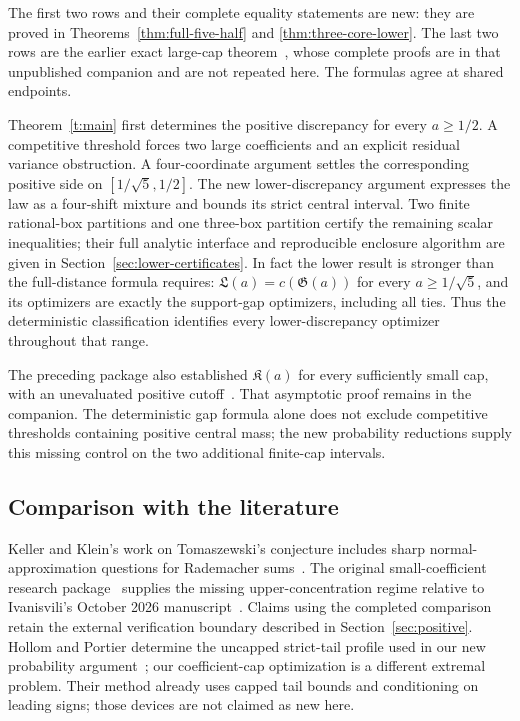 \documentclass[11pt]{article}
\theoremstyle{remark}\newtheorem{remark}[theorem]{Remark}
\begin{document}
The first two rows and their complete equality statements are new:
they are proved in Theorems~\ref{thm:full-five-half} and
\ref{thm:three-core-lower}. The last two rows are the earlier exact
large-cap theorem~\cite{Prior}, whose complete proofs are in that
unpublished companion and are not repeated here. The formulas agree at
shared endpoints.

Theorem~\ref{t:main} first determines the positive discrepancy for every
$a\ge1/2$. A competitive threshold forces two large coefficients and
an explicit residual variance obstruction. A four-coordinate argument
settles the corresponding positive side on $[1/\sqrt5,1/2]$.
The new lower-discrepancy argument expresses the law as a four-shift
mixture and bounds its strict central interval. Two finite rational-box
partitions and one three-box partition certify the remaining scalar
inequalities; their full analytic interface and reproducible enclosure
algorithm are given in Section~\ref{sec:lower-certificates}.
In fact the lower result is stronger than the full-distance formula
requires: $\mathfrak L(a)=c(\mathfrak G(a))$ for every
$a\ge1/\sqrt5$, and its optimizers are exactly the support-gap
optimizers, including all ties. Thus the deterministic classification
identifies every lower-discrepancy optimizer throughout that range.

The preceding package also established $\mathfrak K(a)$ for every
sufficiently small cap, with an unevaluated positive cutoff~\cite{Prior}.
That asymptotic proof remains in the companion. The deterministic gap
formula alone does not exclude competitive thresholds containing
positive central mass; the new probability reductions supply this
missing control on the two additional finite-cap intervals.

\subsection{Comparison with the literature}
Keller and Klein's work on Tomaszewski's conjecture includes sharp
normal-approximation questions for Rademacher sums~\cite{KK}. The
original small-coefficient research package~\cite{Original} supplies the
missing upper-concentration regime relative to Ivanisvili's October 2026
manuscript~\cite{Ivanisvili}. Claims using the completed comparison retain
the external verification boundary described in Section~\ref{sec:positive}.
Hollom and Portier determine the uncapped strict-tail profile used in our
new probability argument~\cite{HP}; our coefficient-cap optimization is
a different extremal problem. Their method already uses capped tail
bounds and conditioning on leading signs; those devices are not claimed
as new here.
\end{document}
